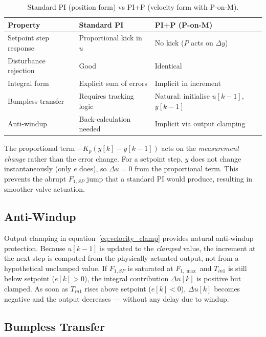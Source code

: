 \begin{table}[H]
  \centering
  \caption{Standard PI (position form) vs PI+P (velocity form with P-on-M).}
  \label{tab:pi_comparison}
  \begin{tabular}{@{}L{4.5cm}L{4.5cm}L{4.5cm}@{}}
    \toprule
    \textbf{Property} & \textbf{Standard PI} & \textbf{PI+P (P-on-M)} \\
    \midrule
    Setpoint step response & Proportional kick in $u$ & No kick ($P$ acts on $\Delta y$) \\
    Disturbance rejection  & Good                     & Identical \\
    Integral form          & Explicit sum of errors   & Implicit in increment \\
    Bumpless transfer      & Requires tracking logic  & Natural: initialise $u[k-1]$, $y[k-1]$ \\
    Anti-windup            & Back-calculation needed  & Implicit via output clamping \\
    \bottomrule
  \end{tabular}
\end{table}

The proportional term $-K_p(y[k]-y[k-1])$ acts on the \textit{measurement change} rather
than the error change. For a setpoint step, $y$ does not change instantaneously (only $e$
does), so $\Delta u = 0$ from the proportional term. This prevents the abrupt $F_{1,SP}$
jump that a standard PI would produce, resulting in smoother valve actuation.

\subsection{Anti-Windup}

Output clamping in equation~\eqref{eq:velocity_clamp} provides natural anti-windup
protection. Because $u[k-1]$ is updated to the \textit{clamped} value, the increment
at the next step is computed from the physically actuated output, not from a hypothetical
unclamped value. If $F_{1,SP}$ is saturated at $F_{1,\max}$ and $T_{in1}$ is still below
setpoint ($e[k] > 0$), the integral contribution $\Delta u[k]$ is positive but clamped.
As soon as $T_{in1}$ rises above setpoint ($e[k] < 0$), $\Delta u[k]$ becomes negative and
the output decreases --- without any delay due to windup.

\subsection{Bumpless Transfer}
\label{sec:bumpless}

